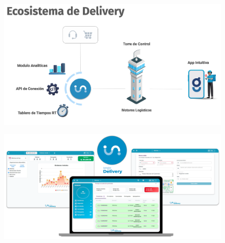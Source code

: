\documentclass[aspectratio=169]{beamer}
\begin{document}
	

\begin{frame}
	\begin{figure}
		\centering
		\includegraphics[width=\linewidth]{Images/ecosistema}
	\end{figure}
\end{frame}

\begin{frame}
	\begin{figure}
		\centering
		\includegraphics[width=\linewidth]{Images/dashboard}
	\end{figure}
\end{frame}
\end{document}
